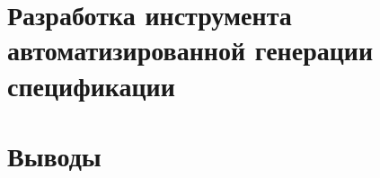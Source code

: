 \chapter{Разработка инструмента автоматизированной генерации спецификации}

\blindtext

\chapter{Выводы}

